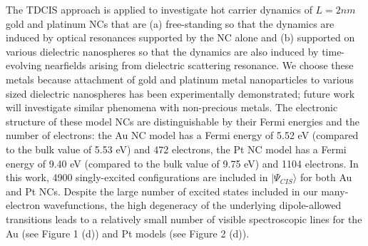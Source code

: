 \documentclass[journal=jpclcd,manuscript=article]{achemso}
\begin{document}
The TDCIS approach is applied to investigate hot carrier dynamics of $L=2nm$ gold and platinum NCs that are (a) free-standing so that
the dynamics are induced by optical resonances supported by the NC alone and (b) supported on various dielectric nanospheres so
that the dynamics are also induced by time-evolving nearfields arising from dielectric scattering resonance.  We choose these metals because 
attachment of gold and platinum metal nanoparticles to various sized dielectric nanospheres has been experimentally demonstrated; future
work will investigate similar phenomena with non-precious metals.
The electronic structure
of these model NCs are distinguishable by their Fermi energies and the number of electrons: the Au NC model has a Fermi energy
of 5.52 eV (compared to the bulk value of 5.53 eV) and 472 electrons, the Pt NC model has a Fermi energy of 9.40 eV (compared to the bulk
value of 9.75 eV) and 1104 electrons. 
In this work, 4900 singly-excited configurations are included in $|\Psi_{CIS}\rangle$ for both Au and Pt NCs.  
Despite the large number of excited states included in our many-electron wavefunctions, the high 
degeneracy of the underlying dipole-allowed transitions leads to a relatively small number of visible spectroscopic lines for the Au (see Figure 1 (d))
and Pt models (see Figure 2 (d)). 
\end{document}
